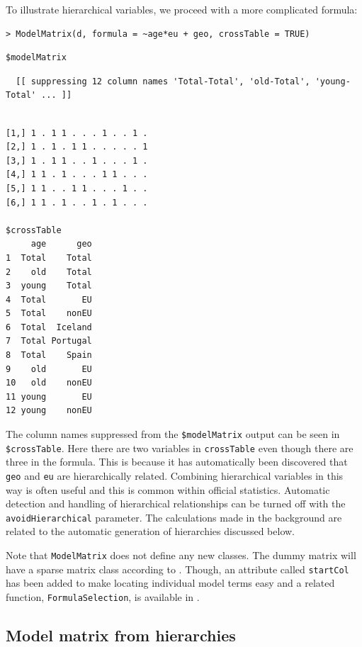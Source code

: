 To illustrate hierarchical variables, we proceed with a more complicated formula:

\begin{verbatim}
> ModelMatrix(d, formula = ~age*eu + geo, crossTable = TRUE)
\end{verbatim}

\begin{verbatim}
$modelMatrix
\end{verbatim}

\begin{verbatim}
  [[ suppressing 12 column names 'Total-Total', 'old-Total', 'young-Total' ... ]]
\end{verbatim}

\begin{verbatim}
                            
[1,] 1 . 1 1 . . . 1 . . 1 .
[2,] 1 . 1 . 1 1 . . . . . 1
[3,] 1 . 1 1 . . 1 . . . 1 .
[4,] 1 1 . 1 . . . 1 1 . . .
[5,] 1 1 . . 1 1 . . . 1 . .
[6,] 1 1 . 1 . . 1 . 1 . . .

$crossTable
     age      geo
1  Total    Total
2    old    Total
3  young    Total
4  Total       EU
5  Total    nonEU
6  Total  Iceland
7  Total Portugal
8  Total    Spain
9    old       EU
10   old    nonEU
11 young       EU
12 young    nonEU
\end{verbatim}

The column names suppressed from the \texttt{\$modelMatrix} output can be seen in \texttt{\$crossTable}.
Here there are two variables in \texttt{crossTable} even though there are three in the formula. This is because it has automatically been discovered that \texttt{geo} and \texttt{eu} are hierarchically related. Combining hierarchical variables in this way is often useful and this is common within official statistics. Automatic detection and handling of hierarchical relationships can be turned off with the \texttt{avoidHierarchical} parameter. The calculations made in the background are related to the automatic generation of hierarchies discussed below.

Note that \texttt{ModelMatrix} does not define any new classes.
The dummy matrix will have a sparse matrix class according to .
Though, an attribute called \texttt{startCol} has been added to make locating individual model terms easy
and a related function, \texttt{FormulaSelection}, is available in .

\hypertarget{model-matrix-from-hierarchies}{%
\subsection{Model matrix from hierarchies}\label{model-matrix-from-hierarchies}}

